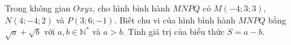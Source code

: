 \begin{ex}
Trong không gian $Oxyz$, cho hình bình hành $MNPQ$ có $M(-4;3;3)$, $N(4;-4;2)$ và $P(3;6;-1)$. Biết chu vi của hình bình hành $MNPQ$ bằng $\sqrt a+\sqrt b$ với $a,b\in\mathbb N^*$ và $a>b$. Tính giá trị của biểu thức $S=a-b$.
\end{ex}
